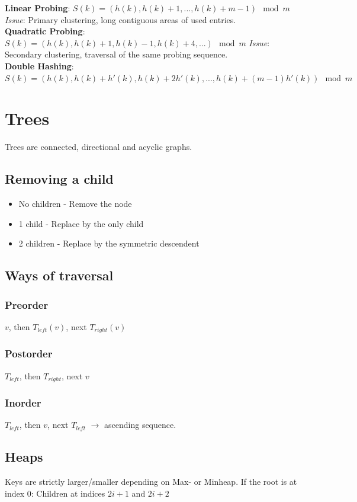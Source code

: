 \documentclass[9pt,landscape,a4paper, table]{extarticle}
\begin{document}
\begin{multicols*}{3}
\textbf{Linear Probing}: $S(k) = (h(k), h(k) + 1 ,..., h(k) + m - 1)\mod m$
\textit{Issue}: Primary clustering, long contiguous areas of used entries.\\ 
\textbf{Quadratic Probing}: $S(k) = (h(k), h(k) + 1, h(k) -1, h(k) + 4, ...)\mod m$ \textit{Issue}: Secondary clustering, traversal of the same probing sequence.\\ 
\textbf{Double Hashing}: $S(k) = (h(k),h(k)+h'(k),h(k)+2h'(k),...,h(k)+(m-1)h'(k))\mod m$

\section{Trees}
Trees are connected, directional and acyclic graphs.

\subsection{Removing a child}
\begin{itemize}
    \item No children - Remove the node
    \item 1 child - Replace by the only child
    \item 2 children - Replace by the symmetric descendent
\end{itemize}

\subsection{Ways of traversal}
\subsubsection{Preorder}
$v$, then $T_{left}(v)$, next $T_{right}(v)$
\subsubsection{Postorder}
$T_{left}$, then $T_{right}$, next $v$
\subsubsection{Inorder}
$T_{left}$, then $v$, next $T_{left}$ $\rightarrow$ ascending sequence.

\subsection{Heaps}
Keys are strictly larger/smaller depending on Max- or Minheap. If the root is at index $0$: Children at indices $2i + 1$ and $2i + 2$

\end{multicols*}
\end{document}

